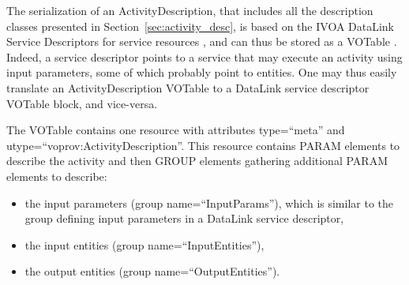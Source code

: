 


The serialization of an ActivityDescription, that includes all the description classes presented in Section~\ref{sec:activity_desc}, is based on the IVOA DataLink Service Descriptors for service resources \citep{std:DataLink}, and can thus be stored as a VOTable \citep{std:VOTABLE}. Indeed, a service descriptor points to a service that may execute an activity using input parameters, some of which probably point to entities. One may thus easily translate an ActivityDescription VOTable to a DataLink service descriptor VOTable block, and vice-versa.

The VOTable contains one resource with attributes type=``meta'' and utype=``voprov:ActivityDescription''. This resource contains PARAM elements to describe the activity and then GROUP elements gathering additional PARAM elements to describe:
\begin{itemize}
 \item the input parameters (group name=``InputParams''), which is similar to the group defining input parameters in a DataLink service descriptor,
 \item the input entities (group name=``InputEntities''),
 \item the output entities (group name=``OutputEntities''). 
 \end{itemize}
 

